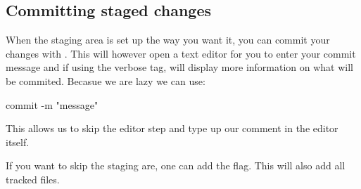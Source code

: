 \subsection{Committing staged changes}
When the staging area is set up the way you want it, you can commit your changes with . This will however open a text editor for you to enter your commit message and if using the  verbose tag, will display more information on what will be commited.\newline
Becasue we are lazy we can use:
\begin{gitBashBox}
commit -m "message"
\end{gitBashBox}
This allows us to skip the editor step and type up our comment in the editor itself.\newline

If you want to skip the staging are, one can add the  flag. This will  also add all tracked files.


